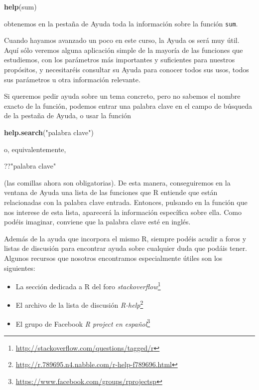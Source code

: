\documentclass[
]{book}
\newenvironment{Shaded}{\begin{snugshade}}{\end{snugshade}}
\newcommand{\KeywordTok}[1]{\textcolor[rgb]{0.13,0.29,0.53}{\textbf{#1}}}
\newcommand{\NormalTok}[1]{#1}
\newcommand{\StringTok}[1]{\textcolor[rgb]{0.31,0.60,0.02}{#1}}
\DeclareRobustCommand{\href}[2]{#2\footnote{\url{#1}}}
\providecommand{\tightlist}{%
  \setlength{\itemsep}{0pt}\setlength{\parskip}{0pt}}
\theoremstyle{definition}
\theoremstyle{definition}
\theoremstyle{definition}
\theoremstyle{remark}
\begin{document}
\begin{Shaded}
\begin{Highlighting}[]
\KeywordTok{help}\NormalTok{(sum)}
\end{Highlighting}
\end{Shaded}

obtenemos en la pestaña de Ayuda toda la información sobre la función \texttt{sum}.

Cuando hayamos avanzado un poco en este curso, la Ayuda os será muy útil. Aquí sólo veremos alguna aplicación simple de la mayoría de las funciones que estudiemos, con los parámetros más importantes y suficientes para nuestros propósitos, y necesitaréis consultar su Ayuda para conocer todos sus usos, todos sus parámetros u otra información relevante.

Si queremos pedir ayuda sobre un tema concreto, pero no sabemos el nombre exacto de la función, podemos entrar una palabra clave en el campo de búsqueda de la pestaña de Ayuda, o usar la función

\begin{Shaded}
\begin{Highlighting}[]
\KeywordTok{help.search}\NormalTok{(}\StringTok{"palabra clave"}\NormalTok{)}
\end{Highlighting}
\end{Shaded}

o, equivalentemente,

\begin{Shaded}
\begin{Highlighting}[]
\NormalTok{??}\StringTok{"palabra clave"}
\end{Highlighting}
\end{Shaded}

(las comillas ahora son obligatorias). De esta manera, conseguiremos en la ventana de Ayuda una lista de las funciones que R entiende que están relacionadas con la palabra clave entrada. Entonces, pulsando en la función que nos interese de esta lista, aparecerá la información específica sobre ella.
Como podéis imaginar, conviene que la palabra clave esté en inglés.

Además de la ayuda que incorpora el mismo R, siempre podéis acudir a foros y listas de discusión para encontrar ayuda sobre cualquier duda que podáis tener. Algunos recursos que nosotros encontramos especialmente útiles son los siguientes:

\begin{itemize}
\tightlist
\item
  La sección dedicada a R del foro \href{http://stackoverflow.com/questions/tagged/r}{\emph{stackoverflow}}
\item
  El archivo de la lista de discusión \href{http://r.789695.n4.nabble.com/r-help-f789696.html}{\emph{R-help}}
\item
  El grupo de Facebook \href{https://www.facebook.com/groups/rprojectsp}{\emph{R project en español}}
\end{itemize}
\end{document}
